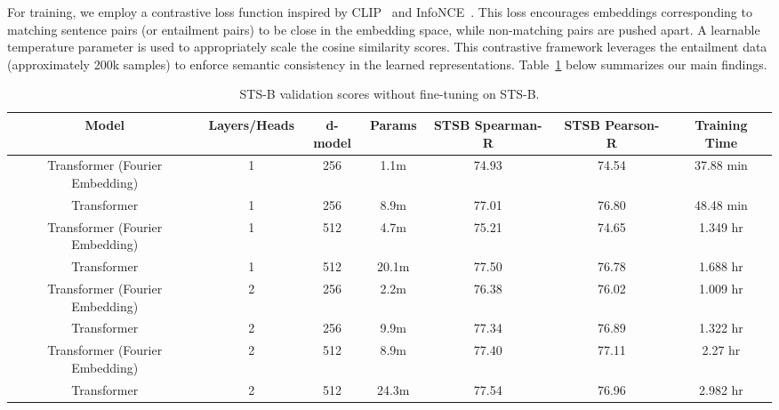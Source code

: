 \documentclass{article}
\begin{document}
For training, we employ a contrastive loss function inspired by CLIP~\cite{radford2021learning} and InfoNCE~\cite{oord2018representation}. This loss encourages embeddings corresponding to matching sentence pairs (or entailment pairs) to be close in the embedding space, while non-matching pairs are pushed apart. A learnable temperature parameter is used to appropriately scale the cosine similarity scores. This contrastive framework leverages the entailment data (approximately 200k samples) to enforce semantic consistency in the learned representations.
Table~\ref{tab:model_scores} below summarizes our main findings.
\begin{table}[h!]
    \centering
    \begin{adjustbox}{max width=\textwidth}
    \begin{tabular}{|c|c|c|c|c|c|c|}
        \hline
        \textbf{Model} & \textbf{Layers/Heads} & \textbf{d-model} & \textbf{Params} & \textbf{STSB Spearman-R} & \textbf{STSB Pearson-R} & \textbf{Training Time}\\
        \hline
        Transformer (Fourier Embedding) & 1 & 256 & 1.1m & 74.93 & 74.54 & 37.88 min\\
        Transformer & 1 & 256 & 8.9m & 77.01 & 76.80 & 48.48 min\\
        \hline
        Transformer (Fourier Embedding) & 1 & 512 & 4.7m & 75.21 & 74.65 & 1.349 hr\\
        Transformer & 1 & 512 & 20.1m & 77.50 & 76.78 & 1.688 hr\\
        \hline
        Transformer (Fourier Embedding) & 2 & 256 & 2.2m & 76.38 & 76.02 & 1.009 hr\\
        Transformer & 2 & 256 & 9.9m & 77.34 & 76.89 & 1.322 hr\\
        \hline
        Transformer (Fourier Embedding) & 2 & 512 & 8.9m & 77.40 & 77.11 & 2.27 hr\\
        Transformer & 2 & 512 & 24.3m & 77.54 & 76.96 & 2.982 hr\\
        \hline
    \end{tabular}
    \end{adjustbox}
    \caption{STS-B validation scores without fine-tuning on STS-B.}
    \label{tab:model_scores}
\end{table}
\end{document}
